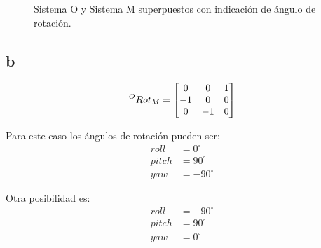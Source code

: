 \documentclass[a4paper,12pt]{article}
\begin{document}
\begin{figure}[H]
    \centering
    \begin{adjustbox}{scale = 0.85, max width=\columnwidth}
    \end{adjustbox}
    \caption{Sistema O y Sistema M superpuestos con indicación de ángulo de rotación.}
\end{figure}

\subsection{b}
\begin{equation*}
    \prescript{O}{}{Rot_M} = 
    \begin{bmatrix}
        0  &  0  & 1 \\
        -1 &  0  & 0 \\
        0  & -1  & 0
    \end{bmatrix}
\end{equation*}

Para este caso los ángulos de rotación pueden ser:
\begin{align*}
    roll  &=   0^\circ\\
    pitch &=  90^\circ\\
    yaw   &= -90^\circ
\end{align*}

Otra posibilidad es:
\begin{align*}
    roll  &= -90^\circ\\
    pitch &=  90^\circ\\
    yaw   &=   0^\circ
\end{align*}
    
\end{document}
